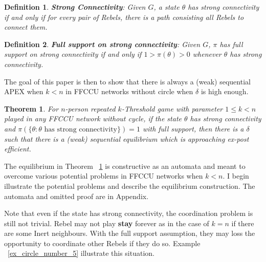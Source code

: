 \documentclass[12pt,letter]{article}
\newtheorem{theorem}{Theorem}
\newtheorem{definition}{Definition}[section]
\theoremstyle{definition}
\theoremstyle{remark}
\theoremstyle{claim}
\begin{document}
\begin{definition}
\textbf{Strong Connectivity}: Given $G$, a state $\theta$ has strong connectivity if and only if for every pair of Rebels, there is a path consisting all Rebels to connect them.
\end{definition}  

\begin{definition}
\textbf{Full support on strong connectivity}: Given $G$, $\pi$ has full support on strong connectivity if and only if $1>\pi(\theta)>0$ whenever $\theta$ has strong connectivity.
\end{definition}  

The goal of this paper is then to show that there is always a (weak) sequential APEX when $k<n$ in FFCCU networks without circle when $\delta$ is high enough.
\begin{theorem}
\label{thm_main_result}
For $n$-person repeated $k$-Threshold game with parameter $1\leq k < n$ played in any FFCCU network without cycle,
if the state $\theta$ has strong connectivity and $\pi(\{\theta: \theta\text{ has strong connectivity}\})=1$ with full support, then there is a $\delta$ such that there is a (weak) sequential equilibrium which is approaching ex-post efficient.
\end{theorem}

The equilibrium in Theorem ~\ref{thm_main_result} is constructive as an automata and meant to overcome various potential problems in FFCCU networks when $k<n$. I begin illustrate the potential problems and describe the equilibrium construction. The automata and omitted proof are in Appendix.  

Note that even if the state has strong connectivity, the coordination problem is still not trivial. Rebel may not play \textbf{stay} forever as in the case of $k=n$ if there are some Inert neighbours. With the full support assumption, they may loss the opportunity to coordinate other Rebels if they do so. Example ~\ref{ex_circle_number_5} illustrate this situation.
\end{document}
